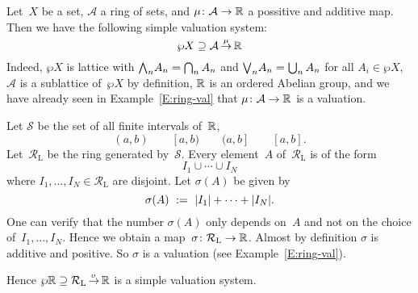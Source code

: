\documentclass[main.tex]{subfiles}
\begin{document}
\begin{ex}
\label{E:ring-system}
Let~$X$ be a set, 
$\mathcal{A}$ a ring of sets,
and $\mu\colon \mathcal{A}\rightarrow \mathbb{R}$
a possitive and additive map.
Then we have the following simple valuation system:
\begin{equation*}
\wp X \supseteq \mathcal{A}\,\smash{\stackrel{\mu}{\rightarrow}}\,\mathbb{R}
\end{equation*}
Indeed, $\wp X$ is lattice with 
$\textstyle{\bigwedge}_n A_n = \bigcap_n A_n$
and $\textstyle{\bigvee}_n A_n = \bigcup_n A_n$ for all $A_i \in \wp X$,
$\mathcal{A}$ is a sublattice of~$\wp X$
by definition,
$\mathbb{R}$ is an ordered Abelian group,
and we have already seen in Example~\ref{E:ring-val}
that $\mu\colon \mathcal{A}\rightarrow \mathbb{R}$ is a valuation.
\end{ex}

\begin{ex}
Let $\mathcal{S}$ be the set of all finite intervals of~$\mathbb{R}$,
\begin{equation*}
(a,b)\qquad [a,b)\qquad (a,b]\qquad [a,b].
\end{equation*}
Let~$\mathcal{R}_\mathrm{L}$ be the ring generated by~$\mathcal{S}$.
Every element~$A$ of~$\mathcal{R}_\mathrm{L}$ is of the form
\begin{equation*}
I_1 \cup \dotsb \cup I_N
\end{equation*}
where $I_1,\dotsc,I_N\in \mathcal{R}_\mathrm{L}$
are disjoint.
Let $\sigma(A)$ be given by
\begin{equation*}
\sigma(A) \ :=\  |I_1| + \dotsb + |I_N|.
\end{equation*}
One can verify that the number $\sigma(A)$
only depends on~$A$ and not on the choice of~$I_1,\dotsc,I_N$.
Hence we obtain a map~$\sigma\colon \mathcal{R}_\mathrm{L} \rightarrow \mathbb{R}$.
Almost by definition $\sigma$ is additive and positive.
So $\sigma$ is a valuation 
(see Example~\ref{E:ring-val}).

Hence $\wp \mathbb{R} \supseteq \mathcal{R}_\mathrm{L}\,\smash{\stackrel{\sigma}{\rightarrow}}\,\mathbb{R}$
is a simple valuation system.
\end{ex}

\end{document}
